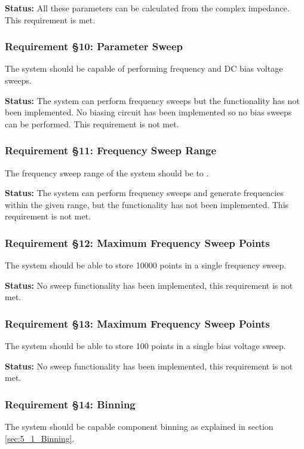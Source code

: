 \textbf{Status:} All these parameters can be calculated from the complex impedance. This requirement is met.
\nl
\nl

\subsubsection*{Requirement §10: Parameter Sweep}
The system should be capable of performing frequency and DC bias voltage sweeps.

\textbf{Status:} The system can perform frequency sweeps but the functionality has not been implemented. No biasing circuit has been implemented so no bias sweeps can be performed. This requirement is not met.
\nl
\nl

\subsubsection*{Requirement §11: Frequency Sweep Range}
The frequency sweep range of the system should be  to .

\textbf{Status:} The system can perform frequency sweeps and generate frequencies within the given range, but the functionality has not been implemented. This requirement is not met.
\nl
\nl

\subsubsection*{Requirement §12: Maximum Frequency Sweep Points}
The system should be able to store 10000 points in a single frequency sweep.

\textbf{Status:} No sweep functionality has been implemented, this requirement is not met.
\nl
\nl

\subsubsection*{Requirement §13: Maximum Frequency Sweep Points}
The system should be able to store 100 points in a single bias voltage sweep.

\textbf{Status:} No sweep functionality has been implemented, this requirement is not met.
\nl
\nl

\subsubsection*{Requirement §14: Binning}
The system should be capable component binning as explained in section \ref{sec:5_1_Binning}.

